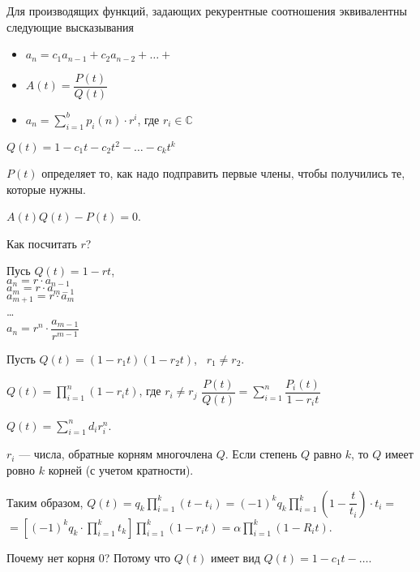 \begin{theorem}
    Для производящих функций, задающих рекурентные соотношения эквивалентны следующие высказывания
    
    \begin{itemize}
        \item $a_n = c_1 a_{n-1} + c_2 a_{n-2} + \dots + $
        \item $A(t) = \dfrac{P(t)}{Q(t)}$
        \item $a_n = \sum_{i = 1}^{b} p_i(n) \cdot r^i$, где $r_i \in \mathbb{C}$ 
    \end{itemize}
\end{theorem}

$Q(t) = 1 - c_1 t - c_2 t^2 - \dots - c_k t^k$

$P(t)$ определяет то, как надо подправить первые члены, чтобы получились те, которые нужны.

$A(t) Q(t)- P(t) = 0$. 

Как посчитать $r$?

Пусь $Q(t) = 1 - rt$,\\
$a_n = r \cdot a_{n - 1}$\\
$a_m = r \cdot a_{m-1}$\\
$a_{m + 1} = r \cdot a_{m}$\\
\ldots\\
$a_n = r^n \cdot \dfrac{a_{m-1}}{r^{m-1}}$

Пусть
$Q(t) = (1 - r_1 t) (1 - r_2 t)$, ~$r_1 \neq r_2$. 

\begin{lemma}
$Q( t ) = \prod_{i=1}^n (1 - r_i t)$, где $r_i \neq r_j$
$\dfrac{P(t)}{Q(t)} = \sum_{i= 1}^n \dfrac{P_i(t)}{1-r_it}$ 
\end{lemma}

$Q(t) = \sum_{i=1}^n d_i r_i^n$.

$r_i$ --- числа, обратные корням многочлена $Q$.
Если степень $Q$ равно $k$, то $Q$ имеет ровно $k$ корней (с учетом кратности).

Таким образом, $Q(t) = q_k \prod_{i=1}^k (t - t_i)  = 
(-1)^k q_k \prod_{i=1}^k \left(1 - \dfrac{t}{t_i} \right) \cdot t_i =$ \\ 
$= \left[ (-1)^k q_k \cdot \prod_{i=1}^k t_k \right] \prod_{i=1}^k (1- r_i t) =\alpha \prod_{i=1}^k (1- R_i t)$.

Почему нет корня 0? Потому что $Q(t)$ имеет вид $Q(t) = 1 - c_1 t - \dots$.

